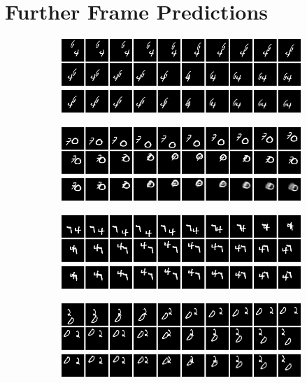 \clearpage
\section{Further Frame Predictions}

\begin{figure}[htpb]
\centering
\begin{subfigure}{0.49\textwidth}
  \centering
  \includegraphics[width=0.92\linewidth]{figures/pred/mm/random/prediction-00.png}
  \caption{}
  \label{fig:mm-pred-random1}
  \vspace{.1cm}
\end{subfigure}%
\begin{subfigure}{0.49\textwidth}
  \centering
  \includegraphics[width=0.92\linewidth]{figures/pred/mm/random/prediction-01.png}
  \caption{}
  \label{fig:mm-pred-random2}
  \vspace{.1cm}
\end{subfigure}
\begin{subfigure}{0.49\textwidth}
  \centering
  \includegraphics[width=0.92\linewidth]{figures/pred/mm/random/prediction-02.png}
  \caption{}
  \label{fig:mm-pred-random3}
\end{subfigure}
\begin{subfigure}{0.49\textwidth}
  \centering
  \includegraphics[width=0.92\linewidth]{figures/pred/mm/random/prediction-03.png}

\end{subfigure}
\end{figure}
